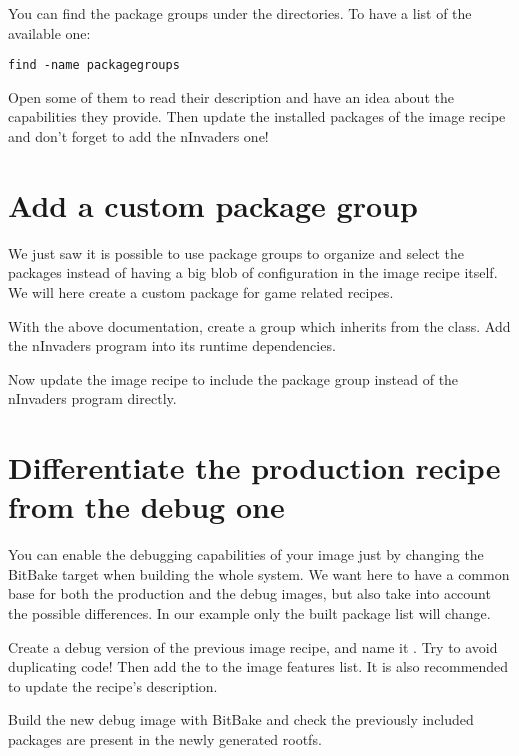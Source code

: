 You can find the package groups under the  directories. To
have a list of the available one:
\begin{verbatim}
find -name packagegroups
\end{verbatim}

Open some of them to read their description and have an idea about the
capabilities they provide. Then update the installed packages of the image
recipe and don't forget to add the nInvaders one!

\section{Add a custom package group}

We just saw it is possible to use package groups to organize and select the
packages instead of having a big blob of configuration in the image recipe
itself. We will here create a custom package for game related recipes.

With the above documentation, create a  group
which inherits from the  class. Add the nInvaders program
into its runtime dependencies.

Now update the image recipe to include the package group instead of the
nInvaders program directly.

\section{Differentiate the production recipe from the debug one}

You can enable the debugging capabilities of your image just by changing the
BitBake target when building the whole system. We want here to have a common
base for both the production and the debug images, but also take into account the
possible differences. In our example only the built package list will change.

Create a debug version of the previous image recipe, and name it
. Try to avoid duplicating code! Then add the
 to the image features list. It is also recommended to
update the recipe's description.

Build the new debug image with BitBake and check the previously
included packages are present in the newly generated rootfs.
